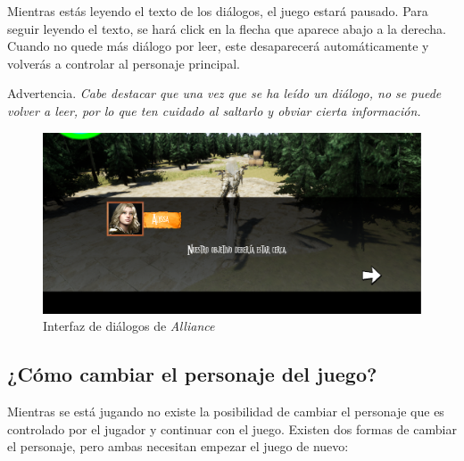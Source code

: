 Mientras estás leyendo el texto de los diálogos, el juego estará pausado. Para seguir leyendo el texto, se hará click en la flecha que aparece abajo a la derecha. Cuando no quede más diálogo por leer, este desaparecerá automáticamente y volverás a controlar al personaje principal.

\renewcommand\bcStyleTitre[1]{\large\hspace*{1.8in}\textcolor{red!100}{#1}}
\begin{bclogo}[
  couleur=red!15,
  arrondi=0.25,
  logo=\hspace*{1in}\bctakecare,
  barre=none,
  noborder=true]{\hspace*{0.15in} Advertencia.}
\itshape \vspace*{0.15in}
Cabe destacar que una vez que se ha leído un diálogo, no se puede volver a leer, por lo que ten cuidado al saltarlo y obviar cierta información.
\end{bclogo}

\begin{figure}[H]
  \centering
  \includegraphics[width=12cm]{./images/Dialogo.png}
  \caption{Interfaz de diálogos de \textit{Alliance}}
  \label{Dialogo}
\end{figure}


\subsection{¿Cómo cambiar el personaje del juego?}

Mientras se está jugando no existe la posibilidad de cambiar el personaje que es controlado por el jugador y continuar con el juego. Existen dos formas de cambiar el personaje, pero ambas necesitan empezar el juego de nuevo:

